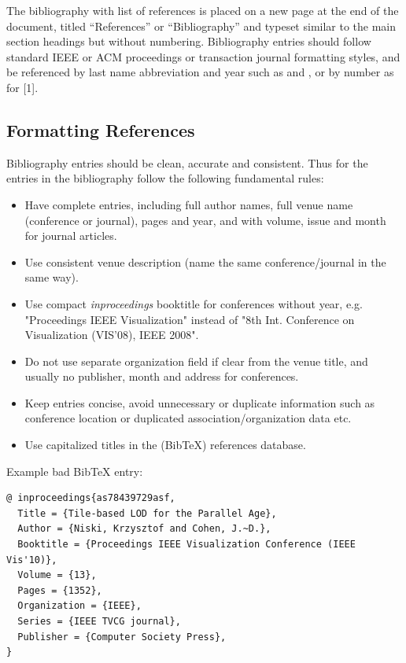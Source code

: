 \documentclass[11pt, a4paper,oneside,chapterprefix=false]{scrbook}
\begin{document}
The bibliography with list of references is placed on a new page at the end of the document, titled ``References'' or ``Bibliography'' and typeset similar to the main section headings but without numbering. Bibliography entries should follow standard IEEE or ACM proceedings or transaction journal formatting styles, and be referenced by last name abbreviation and year such as \cite{Pajarola:07} and \cite{GSSP:10}, or by number as for [1].

\subsection{Formatting References}

Bibliography entries should be clean, accurate and consistent. Thus for the entries in the bibliography follow the following fundamental rules:

\begin{itemize}
\item Have complete entries, including full author names, full venue name (conference or journal), pages and year, and with volume, issue and month for journal articles.
\item Use consistent venue description (name the same conference/journal in the same way).
\item Use compact {\em inproceedings} booktitle for conferences without year, e.g. "Proceedings IEEE Visualization" instead of "8th Int. Conference on Visualization (VIS'08), IEEE 2008".
\item Do not use separate organization field if clear from the venue title, and usually no publisher, month and address for conferences.
\item Keep entries concise, avoid unnecessary or duplicate information such as conference location or duplicated association/organization data etc.
\item Use capitalized titles in the (BibTeX) references database.
\end{itemize}

\noindent
Example bad BibTeX entry:

\begin{verbatim}
@ inproceedings{as78439729asf,
  Title = {Tile-based LOD for the Parallel Age},
  Author = {Niski, Krzysztof and Cohen, J.~D.},
  Booktitle = {Proceedings IEEE Visualization Conference (IEEE Vis'10)},
  Volume = {13},
  Pages = {1352},
  Organization = {IEEE},
  Series = {IEEE TVCG journal},
  Publisher = {Computer Society Press},
}
\end{verbatim}
\end{document}
